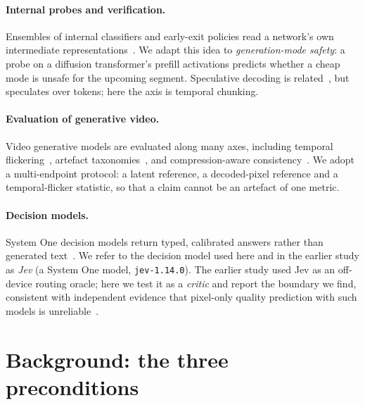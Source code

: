 \documentclass[review]{cas-sc}          %
\begin{document}
\paragraph{Internal probes and verification.}
Ensembles of internal classifiers and early-exit policies read a network's own intermediate
representations~\citep{sun2021early,xu2023lgvit,yoo2026adept,zeng2023consistentee,zhou2020bert}. We adapt this
idea to \emph{generation-mode safety}: a probe on a diffusion transformer's prefill activations predicts
whether a cheap mode is unsafe for the upcoming segment. Speculative decoding is
related~\citep{chen2026dflash,liu2024pearl,li2026is}, but speculates over tokens; here the axis is
temporal chunking.

\paragraph{Evaluation of generative video.}
Video generative models are evaluated along many axes, including temporal
flickering~\citep{huang2024vbench,zheng2025vbench20}, artefact taxonomies~\citep{zhu2026artifactaware}, and
compression-aware consistency~\citep{zsoldos2026evaluating}. We adopt a multi-endpoint protocol: a latent
reference, a decoded-pixel reference and a temporal-flicker statistic, so that a claim cannot be an
artefact of one metric.

\paragraph{Decision models.}
System One decision models return typed, calibrated answers rather than generated
text~\citep{ling2026jev,geuter2026releasing,li2026llmasjev}. We refer to the decision model used here and
in the earlier study as \emph{Jev} (a System One model, \texttt{jev-1.14.0}). The earlier study used Jev
as an off-device routing oracle; here we test it as a \emph{critic} and report the boundary we find,
consistent with independent evidence that pixel-only quality prediction with such models is
unreliable~\citep{robitza2026jevqa}.

\section{Background: the three preconditions}
\label{sec:background}
\end{document}
